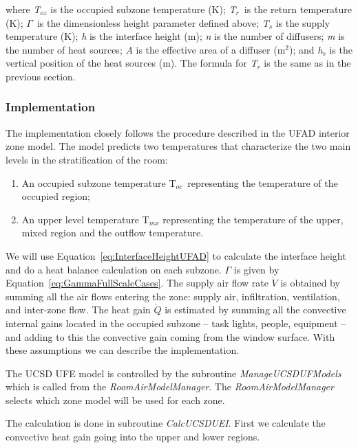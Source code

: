 where \emph{T\(_{oz}\)} is the occupied subzone temperature (K); \emph{T\(_{r}\)}~is the return temperature (K); \emph{\(\Gamma\)}~is the dimensionless height parameter defined above; \emph{T\(_{s}\)} is the supply temperature (K); \emph{h} is the interface height (m); \emph{n} is the number of diffusers; \emph{m} is the number of heat sources; \emph{A} is the effective area of a diffuser (m\(^{2}\)); and \emph{h\(_{s}\)} is the vertical position of the heat sources (m). The formula for \emph{T\(_{r}\)} is the same as in the previous section.

\subsubsection{Implementation}\label{implementation-2}

The implementation closely follows the procedure described in the UFAD interior zone model. The model predicts two temperatures that characterize the two main levels in the stratification of the room:

\begin{enumerate}
\item An occupied subzone temperature T\(_{oc}\)~representing the temperature of the occupied region;
\item An upper level temperature T\(_{mx}\) representing the temperature of the upper, mixed region and the outflow temperature.
\end{enumerate}

We will use Equation~\ref{eq:InterfaceHeightUFAD} to calculate the interface height and do a heat balance calculation on each subzone. \emph{\(\Gamma\)} is given by Equation~\ref{eq:GammaFullScaleCases}. The supply air flow rate \(\dot V\) is obtained by summing all the air flows entering the zone: supply air, infiltration, ventilation, and inter-zone flow. The heat gain \(\dot Q\) is estimated by summing all the convective internal gains located in the occupied subzone -- task lights, people, equipment -- and adding to this the convective gain coming from the window surface. With these assumptions we can describe the implementation.

The UCSD UFE model is controlled by the subroutine \emph{ManageUCSDUFModels} which is called from the \emph{RoomAirModelManager}. The \emph{RoomAirModelManager} selects which zone model will be used for each zone.

The calculation is done in subroutine \emph{CalcUCSDUEI}. First we calculate the convective heat gain going into the upper and lower regions.

